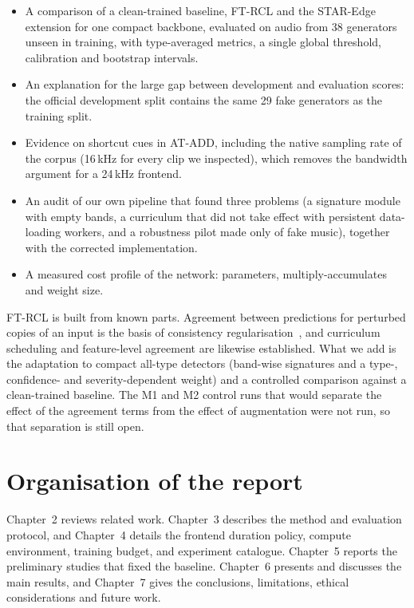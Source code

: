 \documentclass[12pt,a4paper]{report}
\begin{document}
\begin{itemize}
  \item A comparison of a clean-trained baseline, FT-RCL and the STAR-Edge extension for one compact backbone, evaluated on audio from 38 generators unseen in training, with type-averaged metrics, a single global threshold, calibration and bootstrap intervals.
  \item An explanation for the large gap between development and evaluation scores: the official development split contains the same 29 fake generators as the training split.
  \item Evidence on shortcut cues in AT-ADD, including the native sampling rate of the corpus (16\,kHz for every clip we inspected), which removes the bandwidth argument for a 24\,kHz frontend.
  \item An audit of our own pipeline that found three problems (a signature module with empty bands, a curriculum that did not take effect with persistent data-loading workers, and a robustness pilot made only of fake music), together with the corrected implementation.
  \item A measured cost profile of the network: parameters, multiply-accumulates and weight size.
\end{itemize}

FT-RCL is built from known parts. Agreement between predictions for perturbed copies of an input is the basis of consistency regularisation~\cite{xie2020uda,hendrycks2020augmix}, and curriculum scheduling and feature-level agreement are likewise established. What we add is the adaptation to compact all-type detectors (band-wise signatures and a type-, confidence- and severity-dependent weight) and a controlled comparison against a clean-trained baseline. The M1 and M2 control runs that would separate the effect of the agreement terms from the effect of augmentation were not run, so that separation is still open.

\section{Organisation of the report}

Chapter~2 reviews related work. Chapter~3 describes the method and evaluation protocol, and Chapter~4 details the frontend duration policy, compute environment, training budget, and experiment catalogue. Chapter~5 reports the preliminary studies that fixed the baseline. Chapter~6 presents and discusses the main results, and Chapter~7 gives the conclusions, limitations, ethical considerations and future work.
\end{document}
